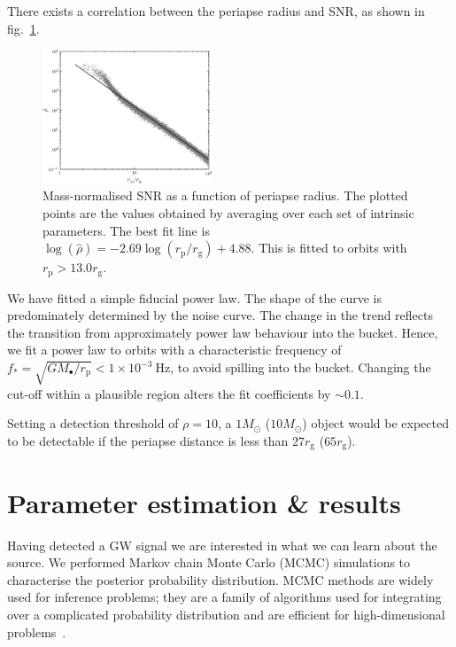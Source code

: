 \documentclass[11pt,twoside]{article}
\begin{document}
There exists a correlation between the periapse radius and SNR, as shown in fig.~\ref{fig:SNR}.
\begin{figure}[ht!]
  \begin{center}
  \includegraphics[width=0.45\textwidth]{Fig_SNR}
    \caption{Mass-normalised SNR as a function of periapse radius. The plotted points are the values obtained by averaging over each set of intrinsic parameters. The best fit line is $\log(\hat{\rho}) = -2.69\log(r_\mathrm{p}/r_\mathrm{g}) + 4.88$. This is fitted to orbits with $r_\mathrm{p} >  13.0 r_\mathrm{g}$.}
    \label{fig:SNR}
  \end{center}
\end{figure}
We have fitted a simple fiducial power law. The shape of the curve is predominately determined by the noise curve. The change in the trend reflects the transition from approximately power law behaviour into the bucket. Hence, we fit a power law to orbits with a characteristic frequency of $f_\ast = \sqrt{GM_\bullet/r_\mathrm{p}} < 1 \times 10^{-3}~\mathrm{Hz}$, to avoid spilling into the bucket. Changing the cut-off within a plausible region alters the fit coefficients by $\sim 0.1$.

Setting a detection threshold of $\rho = 10$, a $1 M_\odot$ ($10 M_\odot$) object would be expected to be detectable if the periapse distance is less than $27 r_\mathrm{g}$ ($65 r_\mathrm{g}$).

\section{Parameter estimation \& results}\label{sec:Estimation}

Having detected a GW signal we are interested in what we can learn about the source. We performed Markov chain Monte Carlo (MCMC) simulations to characterise the posterior probability distribution. MCMC methods are widely used for inference problems; they are a family of algorithms used for integrating over a complicated probability distribution and are efficient for high-dimensional problems~\citep[chapter 29]{MacKay2003}.
\end{document}
